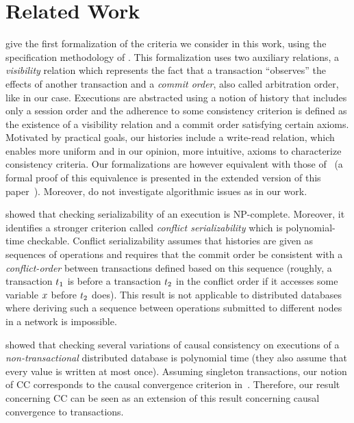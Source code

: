 
\section{Related Work}\label{sec:trans:related}

\cite{DBLP:conf/concur/Cerone0G15} give the first formalization of the criteria we consider in this work, using the specification methodology of \cite{DBLP:conf/popl/BurckhardtGYZ14}. This formalization uses two auxiliary relations, a \emph{visibility} relation which represents the fact that a transaction ``observes'' the effects of another transaction and a \emph{commit order}, also called arbitration order, like in our case. Executions are abstracted using a notion of history that includes only a session order and the adherence to some consistency criterion is defined as the existence of a visibility relation and a commit order satisfying certain axioms. Motivated by practical goals, our histories include a write-read relation, which enables more uniform and in our opinion, more intuitive, axioms to characterize consistency criteria. Our formalizations are however equivalent with those of~\cite{DBLP:conf/concur/Cerone0G15} (a formal proof of this equivalence is presented in the extended version of this paper~\cite{DBLP:journals/corr/abs-1908-04509}). Moreover, \cite{DBLP:conf/concur/Cerone0G15} do not investigate algorithmic issues as in our work.

\cite{DBLP:journals/jacm/Papadimitriou79b} showed that checking serializability of an execution is NP-complete. Moreover, it identifies a stronger criterion called \emph{conflict serializability} which is polynomial-time checkable. Conflict serializability assumes that histories are given as sequences of operations and requires that the commit order be consistent with a \emph{conflict-order} between transactions defined based on this sequence (roughly, a transaction ${t}_1$ is before a transaction ${t}_2$ in the conflict order if it accesses some variable ${x}$ before ${t}_2$ does). This result is not applicable to distributed databases where deriving such a sequence between operations submitted to different nodes in a network is impossible.

\cite{DBLP:conf/popl/BouajjaniEGH17} showed that checking several variations of causal consistency on executions of a \emph{non-transactional} distributed database is polynomial time (they also assume that every value is written at most once). 
Assuming singleton transactions, our notion of CC corresponds to the causal convergence criterion in~\cite{DBLP:conf/popl/BouajjaniEGH17}. Therefore, our result concerning CC can be seen as an extension of this result concerning causal convergence to transactions.

